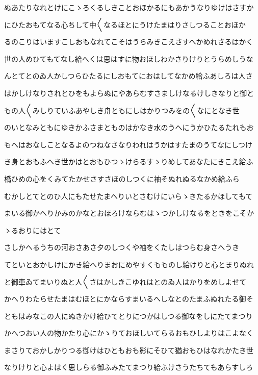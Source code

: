 \documentclass[a4paper,11pt,landscape]{ltjtarticle}
\begin{document}
\par\medskip
ぬあたりなれとけにこゝろくるしきことおほかるにもあかうなりゆけはさすか
\par\medskip
にひたおもてなる心ちして中〱なるほとにうけたまはりさしつることおほか
\par\medskip
るのこりはいますこしおもなれてこそはうらみきこえさすへかめれさるはかく
\par\medskip
世の人めひてもてなし給へくは思はすに物おほしわかさりけりとうらめしうな
\par\medskip
んとてとのゐ人かしつらひたるにしおもてにおはしてなかめ給ふあしろは人さ
\par\medskip
はかしけなりされとひをもよらぬにやあらむすさましけなるけしきなりと御と
\par\medskip
もの人〱みしりていふあやしき舟ともにしはかりつみをの〱なにとなき世
\par\medskip
のいとなみともにゆきかふさまとものはかなき水のうへにうかひたるたれもお
\par\medskip
もへはおなしことなるよのつねなさなりわれはうかはすたまのうてなにしつけ
\par\medskip
き身とおもふへき世かはとおもひつゝけらるすゝりめしてあなたにきこえ給ふ
\par\medskip
橋ひめの心をくみてたかせさすさほのしつくに袖そぬれぬるなかめ給ふら
\par\medskip
むかしとてとのひ人にもたせたまへりいとさむけにいらゝきたるかほしてもて
\par\medskip
まいる御かへりかみのかなとおほろけならむはゝつかしけなるをときをこそか
\par\medskip
ゝるおりにはとて
\par\medskip
さしかへるうちの河おさあさ夕のしつくや袖をくたしはつらむ身さへうき
\par\medskip
てといとおかしけにかき給へりまおにめやすくもものし給けりと心とまりぬれ
\par\medskip
と御車ゐてまいりぬと人〱さはかしきこゆれはとのゐ人はかりをめしよせて
\par\medskip
かへりわたらせたまはむほとにかならすまいるへしなとのたまふぬれたる御そ
\par\medskip
ともはみなこの人にぬきかけ給ひてとりにつかはしつる御なをしにたてまつり
\par\medskip
かへつおい人の物かたり心にかゝりておほしいてらるおもひしよりはこよなく
\par\medskip
まさりておかしかりつる御けはひともおも影にそひて猶おもひはなれかたき世
\par\medskip
なりけりと心よはく思しらる御ふみたてまつり給ふけさうたちてもあらすしろ
\end{document}
